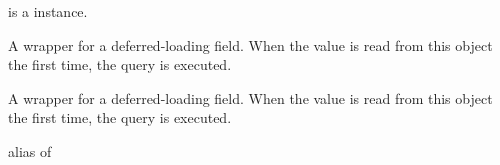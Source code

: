 \documentclass[letterpaper,10pt,english]{sphinxmanual}
\begin{document}
\begin{fulllineitems}
\begin{fulllineitems}
 is a  instance.

\end{fulllineitems}


\begin{fulllineitems}
\label{\detokenize{modules/models:gestion.models.HistoricalKeg.history_user_id}}
A wrapper for a deferred-loading field. When the value is read from this
object the first time, the query is executed.

\end{fulllineitems}


\begin{fulllineitems}
\label{\detokenize{modules/models:gestion.models.HistoricalKeg.id}}
A wrapper for a deferred-loading field. When the value is read from this
object the first time, the query is executed.

\end{fulllineitems}


\begin{fulllineitems}
\label{\detokenize{modules/models:gestion.models.HistoricalKeg.instance}}
\end{fulllineitems}


\begin{fulllineitems}
\label{\detokenize{modules/models:gestion.models.HistoricalKeg.instance_type}}
alias of {\hyperref[\detokenize{modules/models:gestion.models.Keg}]{}}

\end{fulllineitems}


\end{fulllineitems}
\end{document}
